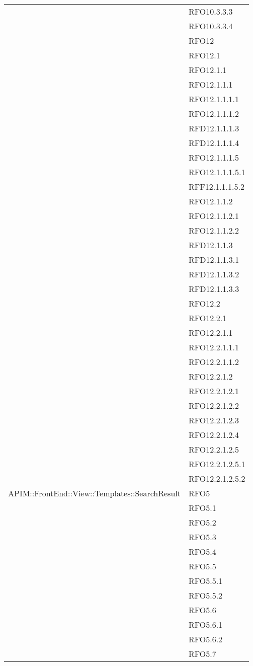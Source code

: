 \begin{longtable}{ p{12cm} | p{4cm} }
& RFO10.3.3.3 \\
& RFO10.3.3.4 \\
& RFO12 \\
& RFO12.1 \\
& RFO12.1.1 \\
& RFO12.1.1.1 \\
& RFO12.1.1.1.1 \\
& RFO12.1.1.1.2 \\
& RFD12.1.1.1.3 \\
& RFD12.1.1.1.4 \\
& RFO12.1.1.1.5 \\
& RFO12.1.1.1.5.1 \\
& RFF12.1.1.1.5.2 \\
& RFO12.1.1.2 \\
& RFO12.1.1.2.1 \\
& RFO12.1.1.2.2 \\
& RFD12.1.1.3 \\
& RFD12.1.1.3.1 \\
& RFD12.1.1.3.2 \\
& RFD12.1.1.3.3 \\
& RFO12.2 \\
& RFO12.2.1 \\
& RFO12.2.1.1 \\
& RFO12.2.1.1.1 \\
& RFO12.2.1.1.2 \\
& RFO12.2.1.2 \\
& RFO12.2.1.2.1 \\
& RFO12.2.1.2.2 \\
& RFO12.2.1.2.3 \\
& RFO12.2.1.2.4 \\
& RFO12.2.1.2.5 \\
& RFO12.2.1.2.5.1 \\
& RFO12.2.1.2.5.2 \\	
		    \hline	    
		    APIM::FrontEnd::View::Templates::SearchResult
		    & RFO5 \\
& RFO5.1 \\
& RFO5.2 \\
& RFO5.3 \\
& RFO5.4 \\
& RFO5.5 \\
& RFO5.5.1 \\
& RFO5.5.2 \\
& RFO5.6\\
& RFO5.6.1 \\
& RFO5.6.2 \\
& RFO5.7 \\

\end{longtable}
